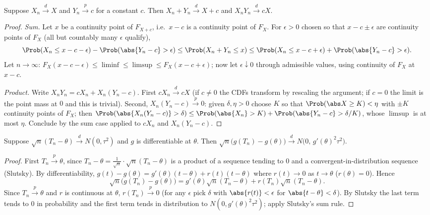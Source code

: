 \begin{theorem}[Slutsky]\label{thm:slutsky}
Suppose $X_n\xrightarrow{d}X$ and $Y_n\xrightarrow{p}c$ for a constant $c$. Then
$X_n+Y_n\xrightarrow{d}X+c$ and $X_nY_n\xrightarrow{d}cX$.
\end{theorem}
\begin{proof}
\emph{Sum.} Let $x$ be a continuity point of $F_{X+c}$, i.e.\ $x-c$ is a continuity point of
$F_X$. For $\epsilon>0$ chosen so that $x-c\pm\epsilon$ are continuity points of $F_X$
(all but countably many $\epsilon$ qualify),
\[
\Prob(X_n\le x-c-\epsilon)-\Prob(\abs{Y_n-c}>\epsilon)\le\Prob(X_n+Y_n\le x)
\le\Prob(X_n\le x-c+\epsilon)+\Prob(\abs{Y_n-c}>\epsilon).
\]
Let $n\to\infty$: $F_X(x-c-\epsilon)\le\liminf\le\limsup\le F_X(x-c+\epsilon)$; now let
$\epsilon\downarrow0$ through admissible values, using continuity of $F_X$ at $x-c$.

\emph{Product.} Write $X_nY_n=cX_n+X_n(Y_n-c)$. First $cX_n\xrightarrow{d}cX$
(if $c\ne0$ the CDFs transform by rescaling the argument; if $c=0$ the limit is the point
mass at $0$ and this is trivial). Second, $X_n(Y_n-c)\xrightarrow{p}0$: given
$\delta,\eta>0$ choose $K$ so that $\Prob(\abs X\ge K)<\eta$ with $\pm K$ continuity
points of $F_X$; then
$\Prob(\abs{X_n(Y_n-c)}>\delta)\le\Prob(\abs{X_n}>K)+\Prob(\abs{Y_n-c}>\delta/K)$, whose
$\limsup$ is at most $\eta$. Conclude by the sum case applied to
$cX_n$ and $X_n(Y_n-c)$.
\end{proof}

\begin{theorem}\label{thm:delta}
Suppose $\sqrt n(T_n-\theta)\xrightarrow{d}N(0,\tau^2)$ and $g$ is differentiable at
$\theta$. Then $\sqrt n\bigl(g(T_n)-g(\theta)\bigr)\xrightarrow{d}N\bigl(0,\,g'(\theta)^2\tau^2\bigr)$.
\end{theorem}
\begin{proof}
First $T_n\xrightarrow{p}\theta$, since $T_n-\theta=\frac1{\sqrt n}\cdot\sqrt n(T_n-\theta)$
is a product of a sequence tending to $0$ and a convergent-in-distribution sequence
(Slutsky). By differentiability, $g(t)-g(\theta)=g'(\theta)(t-\theta)+r(t)(t-\theta)$
where $r(t)\to0$ as $t\to\theta$ ($r(\theta)=0$). Hence
\[
\sqrt n\bigl(g(T_n)-g(\theta)\bigr)=g'(\theta)\sqrt n(T_n-\theta)+r(T_n)\sqrt n(T_n-\theta).
\]
Since $T_n\xrightarrow{p}\theta$ and $r$ is continuous at $\theta$, $r(T_n)\xrightarrow{p}0$
(for any $\epsilon$ pick $\delta$ with $\abs{r(t)}<\epsilon$ for $\abs{t-\theta}<\delta$).
By Slutsky the last term tends to $0$ in probability and the first term tends in
distribution to $N(0,g'(\theta)^2\tau^2)$; apply Slutsky's sum rule.
\end{proof}

